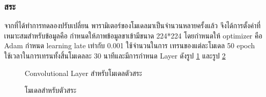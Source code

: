 \documentclass[12pt,oneside,openright,a4paper]{cpe-thai-project}
\begin{document}
      \subsubsection{สระ}
      จากที่ได้ทำการทดลองปรับเปลี่ยน พารามิเตอร์ของโมเดลมาเป็นจำนวนหลายครั้งแล้ว จึงได้การตั้งค่าที่เหมาะสมสำหรับข้อมูลคือ
      กำหนดให้ภาพข้อมูลขาเข้ามีขนาด 224*224 โดยกำหนดให้ optimizer คือ Adam กำหนด learning late เท่ากับ 0.001 ใช้จำนวนในการ
      เทรนของแต่ละโมเดล 50 epoch ใช้เวลาในการเทรนทั้งสิ้นโมเดลละ 30 นาทีและมีการกำหนด Layer ดังรูป \ref{fig:convvowelconf} และรูป \ref{fig:modelvowelconf}
\begin{figure}[!ht]\centering
  \setlength{\fboxrule}{0.2mm} %
  \setlength{\fboxsep}{1cm}
  \caption{Convolutional Layer สำหรับโมเดลตัวสระ}\label{fig:convvowelconf}
 \end{figure}
\begin{figure}[!ht]\centering
  \setlength{\fboxrule}{0.2mm} %
  \setlength{\fboxsep}{1cm}
  \caption{โมเดลสำหรับตัวสระ}\label{fig:modelvowelconf}
 \end{figure}
\end{document}
